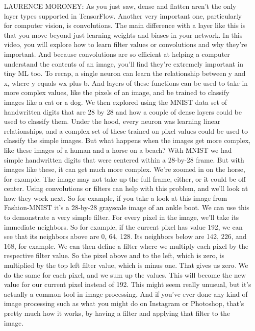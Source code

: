 LAURENCE MORONEY: As you just saw, dense and flatten
aren't the only layer types supported in TensorFlow.
Another very important one, particularly for computer vision, is convolutions.
The main difference with a layer like this
is that you move beyond just learning weights and biases in your network.
In this video, you will explore how to learn filter values or convolutions
and why they're important.
And because convolutions are so efficient at helping
a computer understand the contents of an image,
you'll find they're extremely important in tiny ML too.
To recap, a single neuron can learn the relationship between y
and x, where y equals wx plus b.
And layers of these functions can be used to take in more complex values,
like the pixels of an image, and be trained
to classify images like a cat or a dog.
We then explored using the MNIST data set of handwritten digits
that are 28 by 28 and how a couple of dense layers
could be used to classify them.
Under the hood, every neuron was learning linear relationships,
and a complex set of these trained on pixel values
could be used to classify the simple images.
But what happens when the images get more complex,
like these images of a human and a horse on a beach?
With MNIST we had simple handwritten digits
that were centered within a 28-by-28 frame.
But with images like these, it can get much more complex.
We're zoomed in on the horse, for example.
The image may not take up the full frame,
either, or it could be off center.
Using convolutions or filters can help with this problem,
and we'll look at how they work next.
So for example, if you take a look at this image from Fashion-MNIST
it's a 28-by-28 grayscale image of an ankle boot.
We can use this to demonstrate a very simple filter.
For every pixel in the image, we'll take its immediate neighbors.
So for example, if the current pixel has value 192,
we can see that its neighbors above are 0, 64, 128.
Its neighbors below are 142, 226, and 168, for example.
We can then define a filter where we multiply each pixel
by the respective filter value.
So the pixel above and to the left, which is zero,
is multiplied by the top left filter value, which is minus one.
That gives us zero.
We do the same for each pixel, and we sum up the values.
This will become the new value for our current pixel instead of 192.
This might seem really unusual, but it's actually
a common tool in image processing.
And if you've ever done any kind of image processing
such as what you might do on Instagram or Photoshop,
that's pretty much how it works, by having a filter
and applying that filter to the image.
